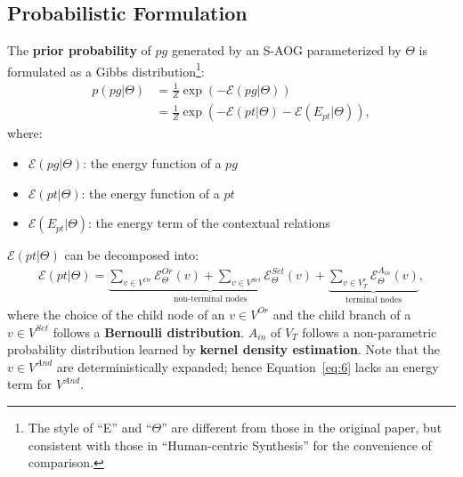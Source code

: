 \documentclass[10pt]{article}
\newcommand{\Eq}[1]{Equation~\ref{eq:#1}}
\begin{document}
\subsection{Probabilistic Formulation}%
\label{sec:formulation}
The \textbf{prior probability} of $pg$ generated by an S-AOG parameterized by
$\Theta$ is formulated as a Gibbs distribution\footnote{\label{note3}The style
of ``E'' and ``$\Theta$'' are different from those in the original paper, but
consistent with those in ``Human-centric Synthesis'' for the convenience of
comparison.}:
%
\begin{align}
  p(pg \vert \Theta) &= \frac{1}{Z} \exp (-\mathcal{E}(pg \vert \Theta)) \label{eq:4} \\
                     &= \frac{1}{Z} \exp (-\mathcal{E}(pt \vert \Theta) - \mathcal{E}(E_{pt} \vert \Theta)), \label{eq:5}
\end{align}
%
where:
%
\begin{itemize}
  \item $\mathcal{E}(pg \vert \Theta)$: the energy function of a $pg$
  \item $\mathcal{E}(pt \vert \Theta)$: the energy function of a $pt$
  \item $\mathcal{E}(E_{pt} \vert \Theta)$: the energy term of the contextual
    relations
\end{itemize}
%
$\mathcal{E}(pt \vert \Theta)$ can be decomposed into:
%
\begin{align}
  \label{eq:6}
  \mathcal{E}(pt \vert \Theta) = \underbrace{\sum_{v \in V^{Or}} \mathcal{E}^{Or}_{\Theta}(v) + \sum_{v \in V^{Set}} \mathcal{E}^{Set}_{\Theta}(v)}_{\text{non-terminal nodes}} + \underbrace{\sum_{v \in V^r_T} \mathcal{E}^{A_{in}}_{\Theta}(v)}_{\text{terminal nodes}},
\end{align}
%
where the choice of the child node of an $v \in V^{Or}$ and the child branch of
a $v \in V^{Set}$ follows a \textbf{Bernoulli distribution}. $A_{in}$
of $V_T$ follows a non-parametric probability distribution learned by
\textbf{kernel density estimation}. Note that the $v \in V^{And}$ are
deterministically expanded; hence \Eq{6} lacks an energy term for $V^{And}$.
\end{document}
